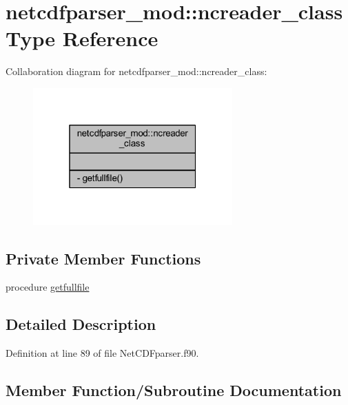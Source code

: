 \hypertarget{structnetcdfparser__mod_1_1ncreader__class}{}\section{netcdfparser\+\_\+mod\+:\+:ncreader\+\_\+class Type Reference}
\label{structnetcdfparser__mod_1_1ncreader__class}


Collaboration diagram for netcdfparser\+\_\+mod\+:\+:ncreader\+\_\+class\+:\nopagebreak
\begin{figure}[H]
\begin{center}
\leavevmode
\includegraphics[width=217pt]{structnetcdfparser__mod_1_1ncreader__class__coll__graph}
\end{center}
\end{figure}
\subsection*{Private Member Functions}
\begin{DoxyCompactItemize}
\item 
procedure \mbox{\hyperlink{structnetcdfparser__mod_1_1ncreader__class_ad9999a0a79e3ff5d88dd4108b70d59f3}{getfullfile}}
\end{DoxyCompactItemize}


\subsection{Detailed Description}


Definition at line 89 of file Net\+C\+D\+Fparser.\+f90.



\subsection{Member Function/\+Subroutine Documentation}
\mbox{\label{structnetcdfparser__mod_1_1ncreader__class_ad9999a0a79e3ff5d88dd4108b70d59f3}} 
